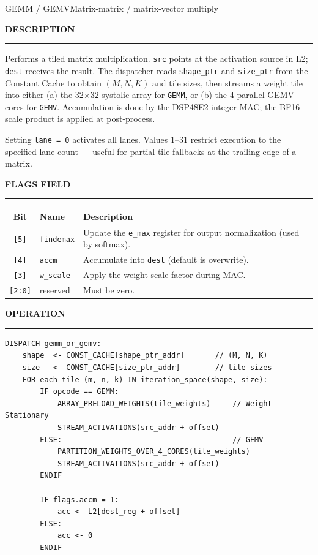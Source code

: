 \documentclass[11pt,a4paper,twoside,openany]{report}
\newcommand{\RefSection}[1]{%
  \par\medskip
  {\sffamily\bfseries\color{oceanblue}\normalsize\MakeUppercase{#1}}
  \par\vspace{-0.4em}
  {\color{oceanblue}\rule{\linewidth}{0.4pt}}\par\smallskip
}
\begin{document}
\begin{InstructionRef}{GEMM / GEMV}{Matrix-matrix / matrix-vector multiply}
\RefSection{Description}

Performs a tiled matrix multiplication. \texttt{src} points at the
activation source in L2; \texttt{dest} receives the result. The
dispatcher reads \texttt{shape\_ptr} and \texttt{size\_ptr} from the
Constant Cache to obtain $(M, N, K)$ and tile sizes, then streams a
weight tile into either (a) the 32$\times$32 systolic array for
\texttt{GEMM}, or (b) the 4 parallel GEMV cores for \texttt{GEMV}.
Accumulation is done by the DSP48E2 integer MAC; the BF16 scale
product is applied at post-process.

Setting \texttt{lane = 0} activates all lanes. Values 1--31 restrict
execution to the specified lane count — useful for partial-tile
fallbacks at the trailing edge of a matrix.

\RefSection{Flags field}

\begin{tabularx}{\linewidth}{|c|l|X|}
\hline
\rowcolor{skytint}
\textbf{Bit} & \textbf{Name} & \textbf{Description} \\
\hline
\texttt{[5]}   & \texttt{findemax} & Update the \texttt{e\_max} register for output normalization (used by softmax). \\
\hline
\texttt{[4]}   & \texttt{accm}     & Accumulate into \texttt{dest} (default is overwrite). \\
\hline
\texttt{[3]}   & \texttt{w\_scale} & Apply the weight scale factor during MAC. \\
\hline
\texttt{[2:0]} & reserved          & Must be zero. \\
\hline
\end{tabularx}

\RefSection{Operation}

\begin{lstlisting}[style=pseudo]
DISPATCH gemm_or_gemv:
    shape  <- CONST_CACHE[shape_ptr_addr]       // (M, N, K)
    size   <- CONST_CACHE[size_ptr_addr]        // tile sizes
    FOR each tile (m, n, k) IN iteration_space(shape, size):
        IF opcode == GEMM:
            ARRAY_PRELOAD_WEIGHTS(tile_weights)     // Weight Stationary
            STREAM_ACTIVATIONS(src_addr + offset)
        ELSE:                                       // GEMV
            PARTITION_WEIGHTS_OVER_4_CORES(tile_weights)
            STREAM_ACTIVATIONS(src_addr + offset)
        ENDIF

        IF flags.accm = 1:
            acc <- L2[dest_reg + offset]
        ELSE:
            acc <- 0
        ENDIF


\end{lstlisting}
\end{InstructionRef}
\end{document}
